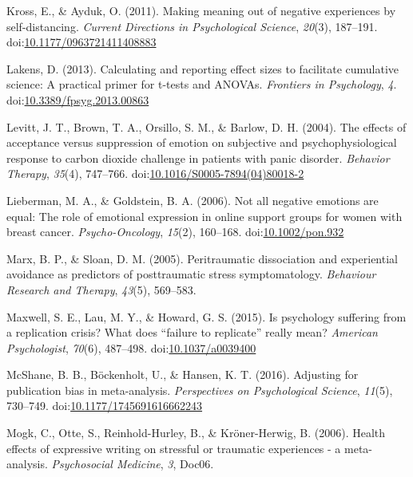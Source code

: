 \documentclass[,man]{apa6}
\begin{document}
\leavevmode\hypertarget{ref-Kross2011}{}%
Kross, E., \& Ayduk, O. (2011). Making meaning out of negative experiences by self-distancing. \emph{Current Directions in Psychological Science}, \emph{20}(3), 187--191. doi:\href{https://doi.org/10.1177/0963721411408883}{10.1177/0963721411408883}

\leavevmode\hypertarget{ref-Lakens2013}{}%
Lakens, D. (2013). Calculating and reporting effect sizes to facilitate cumulative science: A practical primer for t-tests and ANOVAs. \emph{Frontiers in Psychology}, \emph{4}. doi:\href{https://doi.org/10.3389/fpsyg.2013.00863}{10.3389/fpsyg.2013.00863}

\leavevmode\hypertarget{ref-Levitt2004}{}%
Levitt, J. T., Brown, T. A., Orsillo, S. M., \& Barlow, D. H. (2004). The effects of acceptance versus suppression of emotion on subjective and psychophysiological response to carbon dioxide challenge in patients with panic disorder. \emph{Behavior Therapy}, \emph{35}(4), 747--766. doi:\href{https://doi.org/10.1016/S0005-7894(04)80018-2}{10.1016/S0005-7894(04)80018-2}

\leavevmode\hypertarget{ref-Lieberman2006}{}%
Lieberman, M. A., \& Goldstein, B. A. (2006). Not all negative emotions are equal: The role of emotional expression in online support groups for women with breast cancer. \emph{Psycho-Oncology}, \emph{15}(2), 160--168. doi:\href{https://doi.org/10.1002/pon.932}{10.1002/pon.932}

\leavevmode\hypertarget{ref-Marx2005}{}%
Marx, B. P., \& Sloan, D. M. (2005). Peritraumatic dissociation and experiential avoidance as predictors of posttraumatic stress symptomatology. \emph{Behaviour Research and Therapy}, \emph{43}(5), 569--583.

\leavevmode\hypertarget{ref-Maxwell2015}{}%
Maxwell, S. E., Lau, M. Y., \& Howard, G. S. (2015). Is psychology suffering from a replication crisis? What does ``failure to replicate'' really mean? \emph{American Psychologist}, \emph{70}(6), 487--498. doi:\href{https://doi.org/10.1037/a0039400}{10.1037/a0039400}

\leavevmode\hypertarget{ref-McShane2016}{}%
McShane, B. B., Böckenholt, U., \& Hansen, K. T. (2016). Adjusting for publication bias in meta-analysis. \emph{Perspectives on Psychological Science}, \emph{11}(5), 730--749. doi:\href{https://doi.org/10.1177/1745691616662243}{10.1177/1745691616662243}

\leavevmode\hypertarget{ref-Mogk2006}{}%
Mogk, C., Otte, S., Reinhold-Hurley, B., \& Kröner-Herwig, B. (2006). Health effects of expressive writing on stressful or traumatic experiences - a meta-analysis. \emph{Psychosocial Medicine}, \emph{3}, Doc06.
\end{document}
